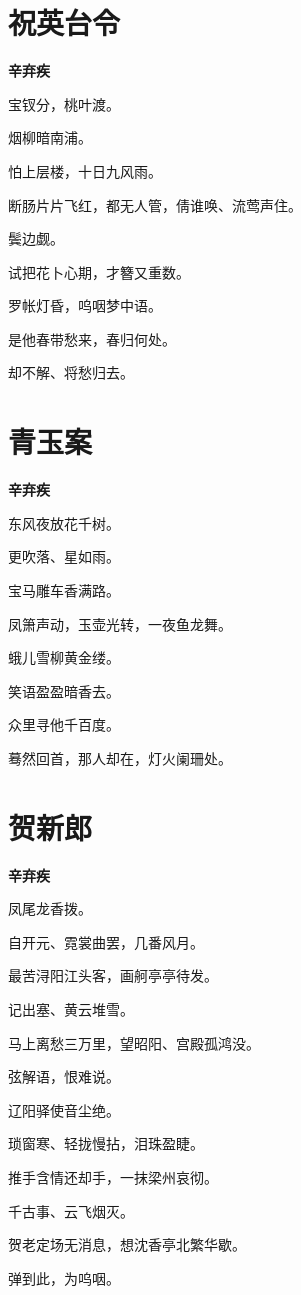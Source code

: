 \documentclass[12pt,a4paper]{ctexbook}
\begin{document}
\section{祝英台令}
\textbf{辛弃疾}\par\vspace{0.5em}
宝钗分，桃叶渡。\par
烟柳暗南浦。\par
怕上层楼，十日九风雨。\par
断肠片片飞红，都无人管，倩谁唤、流莺声住。\par
鬓边觑。\par
试把花卜心期，才簪又重数。\par
罗帐灯昏，呜咽梦中语。\par
是他春带愁来，春归何处。\par
却不解、将愁归去。\par

\section{青玉案}
\textbf{辛弃疾}\par\vspace{0.5em}
东风夜放花千树。\par
更吹落、星如雨。\par
宝马雕车香满路。\par
凤箫声动，玉壶光转，一夜鱼龙舞。\par
蛾儿雪柳黄金缕。\par
笑语盈盈暗香去。\par
众里寻他千百度。\par
蓦然回首，那人却在，灯火阑珊处。\par

\section{贺新郎}
\textbf{辛弃疾}\par\vspace{0.5em}
凤尾龙香拨。\par
自开元、霓裳曲罢，几番风月。\par
最苦浔阳江头客，画舸亭亭待发。\par
记出塞、黄云堆雪。\par
马上离愁三万里，望昭阳、宫殿孤鸿没。\par
弦解语，恨难说。\par
辽阳驿使音尘绝。\par
琐窗寒、轻拢慢拈，泪珠盈睫。\par
推手含情还却手，一抹梁州哀彻。\par
千古事、云飞烟灭。\par
贺老定场无消息，想沈香亭北繁华歇。\par
弹到此，为呜咽。\par
\end{document}
